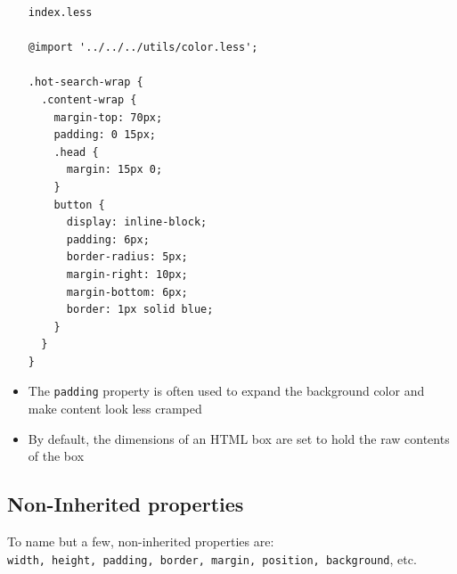 \documentclass[a4paper, 12pt]{article}
\begin{document}
\begin{itemize}
\begin{verbatim}
index.less

@import '../../../utils/color.less';

.hot-search-wrap {
  .content-wrap {
    margin-top: 70px;
    padding: 0 15px;
    .head {
      margin: 15px 0;
    }
    button {
      display: inline-block;
      padding: 6px;
      border-radius: 5px;
      margin-right: 10px;
      margin-bottom: 6px;
      border: 1px solid blue;
    }
  }
}
\end{verbatim}

\item The \verb|padding| property is often used to expand the background color and make content look less cramped

\item By default, the dimensions of an HTML box are set to hold the raw contents of the box

\end{itemize}


\subsection{Non-Inherited properties}
To name but a few, non-inherited properties are:\\ \verb|width, height, padding, border, margin, position, background|, etc.
\end{document}
